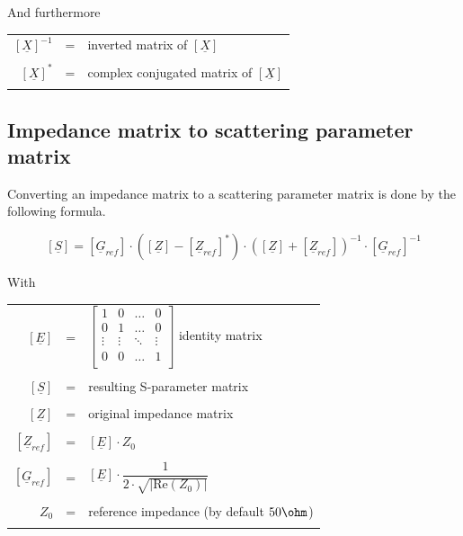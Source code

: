 \documentclass[10pt]{report}
\begin{document}
And furthermore

\addvspace{12pt}

\begin{tabular}{rll}
$\left[\underline{X}\right]^{-1}$ & = & 
inverted matrix of $\left[\underline{X}\right]$\\& &\\
$\left[\underline{X}\right]^{*}$ & = & 
complex conjugated matrix of $\left[\underline{X}\right]$\\& &\\
\end{tabular}

\subsection{Impedance matrix to scattering parameter matrix}

Converting an impedance matrix to a scattering parameter matrix is
done by the following formula.

\begin{equation}
\left[
\underline{S}
\right]
=
\left[
\underline{G}_{ref}
\right]
\cdot
\left(
\left[\underline{Z}\right] - \left[\underline{Z}_{ref}\right]^{*}
\right)
\cdot
\left(
\left[\underline{Z}\right] + \left[\underline{Z}_{ref}\right]
\right)^{-1}
\cdot
\left[\underline{G}_{ref}\right]^{-1}
\end{equation}

With

\addvspace{12pt}

\begin{tabular}{rll}
$\left[\underline{E}\right]$ & = &
$\begin{bmatrix}
1 & 0 & \ldots & 0\\
0 & 1 & \ldots & 0\\
\vdots & \vdots & \ddots & \vdots\\
0 & 0 & \ldots & 1\\
\end{bmatrix}$
identity matrix\\& &\\
$\left[\underline{S}\right]$ & = & resulting S-parameter matrix\\& &\\
$\left[\underline{Z}\right]$ & = & original impedance matrix\\& &\\
$\left[\underline{Z}_{ref}\right]$ & = &
$\left[\underline{E}\right] \cdot Z_{0}$\\& &\\
$\left[\underline{G}_{ref}\right]$ & = &
$\left[\underline{E}\right] \cdot 
\dfrac{1}{2\cdot \sqrt{\left| \text{Re}\left(Z_{0}\right)\right|}}$\\& &\\
$Z_{0}$ & = & reference impedance (by default $50\ohm$)\\& &\\
\end{tabular}
\end{document}
